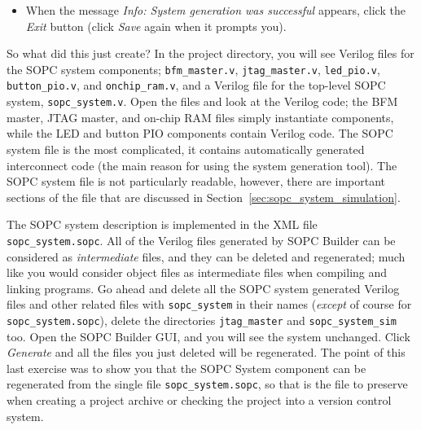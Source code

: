 \documentclass[10pt,twoside]{article}
\begin{document}
\begin{itemize}
SOPC Builder pops-up a {\em Save changes?} dialog window asking if you want 
to {\em Save changes to unnamed?} Click the {\em Save} button to bring
up the {\em Save} dialog window. Enter the system name, \verb+sopc_system.sopc+,
and click {\em Save}\footnote{See Appendix~\ref{app:altera_bugs}, 
Note 1.}\label{bug:1}.

\item When the message {\em Info: System generation was successful} appears, click 
the {\em Exit} button (click {\em Save} again when it prompts you).

\end{itemize}

So what did this just create? In the project directory, you will
see Verilog files for the SOPC system components;
\verb+bfm_master.v+, \verb+jtag_master.v+, \verb+led_pio.v+,
\verb+button_pio.v+, and \verb+onchip_ram.v+, and
a Verilog file for the top-level SOPC system,
\verb+sopc_system.v+. Open the files and look at the Verilog
code; the BFM master, JTAG master, and on-chip RAM files
simply instantiate components, while the LED and button PIO
components contain Verilog code. The SOPC system file is
the most complicated, it contains automatically generated
interconnect code (the main reason for using the system
generation tool). The SOPC system file is not particularly
readable, however, there are important sections of the file
that are discussed in Section~\ref{sec:sopc_system_simulation}.

The SOPC system description is implemented in the XML file
\verb+sopc_system.sopc+. All of the Verilog files generated
by SOPC Builder can be considered as {\em intermediate} files,
and they can be deleted and regenerated; much like you would
consider object files as intermediate files when compiling and
linking programs.
%
Go ahead and delete all the SOPC system generated Verilog files
and other related files with \verb+sopc_system+ in their names
({\em except} of course for \verb+sopc_system.sopc+), 
delete the directories \verb+jtag_master+ and \verb+sopc_system_sim+ 
too. Open the SOPC Builder GUI, and you will see the system 
unchanged. Click {\em Generate} and all the files you just deleted
will be regenerated.
%
The point of this last exercise was to show you that the
SOPC System component can be regenerated from the single
file \verb+sopc_system.sopc+, so that is the file to preserve
when creating a project archive or checking the project into
a version control system.

\clearpage
\end{document}

